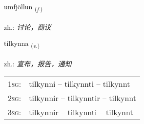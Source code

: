 \documentclass[frontgrid, backgrid]{flacards}\usepackage[]{graphicx}\usepackage[]{xcolor}
\begin{document}
\renewcommand{\flhead}{\vskip5pt \fboxsep=0pt {\small\bfseries\footnotesize Nafnorð | 名词}}
\renewcommand{\fcfoot}{\vskip5pt \fboxsep=0pt \hspace{2pt}{\small\bfseries\footnotesize 1K}}

\renewcommand{\blhead}{\vskip5pt {\small\bfseries\footnotesize Nafnorð | 名词 }}
\renewcommand{\bcfoot}{\vskip5pt \hspace{2pt}{\small\bfseries\footnotesize 1K}}


{umfjöllun \small{\textsubscript{(\textit{f.})}} \\[1ex] %
\textphonetic{[ʏmfjœtlʏn]} \\
zh.: \emph{讨论，商议} \\  [2ex]
\renewcommand*{\arraystretch}{0.8}
}

\renewcommand{\flhead}{\vskip5pt \fboxsep=0pt {\small\bfseries\footnotesize Sagnorð | 动词}}
\renewcommand{\fcfoot}{\vskip5pt \fboxsep=0pt \hspace{2pt}{\small\bfseries\footnotesize 1K}}

\renewcommand{\blhead}{\vskip5pt {\small\bfseries\footnotesize Sagnorð | 动词 }}
\renewcommand{\bcfoot}{\vskip5pt \hspace{2pt}{\small\bfseries\footnotesize 1K}}


{tilkynna \small{\textsubscript{(\textit{v.})}} \\[1ex] %
\textphonetic{[tʰɪlcʰɪna]} \\
zh.: \emph{宣布，报告，通知} \\  [2ex]
\renewcommand*{\arraystretch}{0.8}
\begin{tabular}{p{1cm}l}
\textsc{1sg}: & tilkynni -- tilkynnti -- tilkynnt \\ 
\textsc{2sg}: & tilkynnir -- tilkynntir -- tilkynnt \\ 
\textsc{3sg}: & tilkynnir -- tilkynnti -- tilkynnt \\ 
\end{tabular}
}
\end{document}
